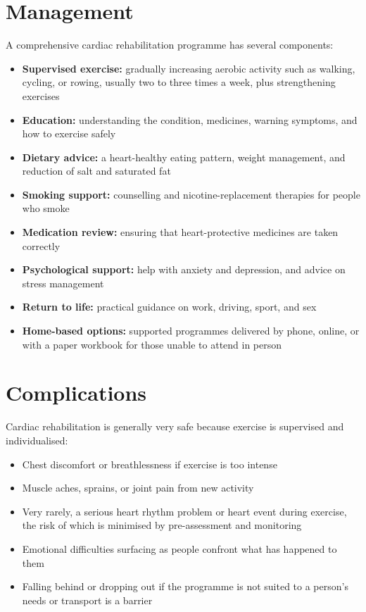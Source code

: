 \section*{Management}
A comprehensive cardiac rehabilitation programme has several components:
\begin{itemize}
    \item \textbf{Supervised exercise:} gradually increasing aerobic activity such as walking, cycling, or rowing, usually two to three times a week, plus strengthening exercises
    \item \textbf{Education:} understanding the condition, medicines, warning symptoms, and how to exercise safely
    \item \textbf{Dietary advice:} a heart-healthy eating pattern, weight management, and reduction of salt and saturated fat
    \item \textbf{Smoking support:} counselling and nicotine-replacement therapies for people who smoke
    \item \textbf{Medication review:} ensuring that heart-protective medicines are taken correctly
    \item \textbf{Psychological support:} help with anxiety and depression, and advice on stress management
    \item \textbf{Return to life:} practical guidance on work, driving, sport, and sex
    \item \textbf{Home-based options:} supported programmes delivered by phone, online, or with a paper workbook for those unable to attend in person
\end{itemize}

\section*{Complications}
Cardiac rehabilitation is generally very safe because exercise is supervised and individualised:
\begin{itemize}
    \item Chest discomfort or breathlessness if exercise is too intense
    \item Muscle aches, sprains, or joint pain from new activity
    \item Very rarely, a serious heart rhythm problem or heart event during exercise, the risk of which is minimised by pre-assessment and monitoring
    \item Emotional difficulties surfacing as people confront what has happened to them
    \item Falling behind or dropping out if the programme is not suited to a person's needs or transport is a barrier
\end{itemize}

